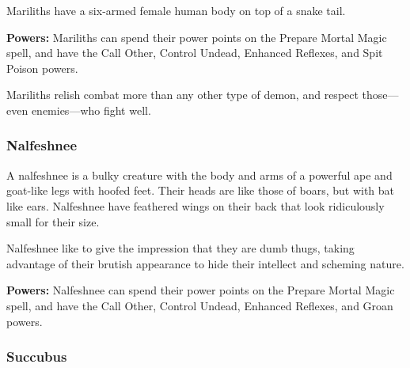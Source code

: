 \begin{multicols*}{2}
Mariliths have a six-armed female human body on top of a snake tail.

\textbf{Powers:} Mariliths can spend their power points on the Prepare Mortal Magic spell, and have the Call Other, Control Undead, Enhanced Reflexes, and Spit Poison powers.

Mariliths relish combat more than any other type of demon, and respect those—even enemies—who fight well.

\subsubsection{Nalfeshnee}

A nalfeshnee is a bulky creature with the body and arms of a powerful ape and goat-like legs with hoofed feet. Their heads are like those of boars, but with bat like ears. Nalfeshnee have feathered wings on their back that look ridiculously small for their size.

Nalfeshnee like to give the impression that they are dumb thugs, taking advantage of their brutish appearance to hide their intellect and scheming nature.

\textbf{Powers:} Nalfeshnee can spend their power points on the Prepare Mortal Magic spell, and have the Call Other, Control Undead, Enhanced Reflexes, and Groan powers.

\subsubsection{Succubus}
\end{multicols*}
